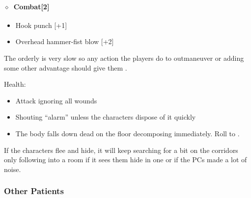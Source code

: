 \paragraph{\(\diamond\)~Combat[2]}%
\begin{itemize}[noitemsep]
  \item Hook punch [+1]
  \item Overhead hammer-fist blow [+2]
\end{itemize}
The orderly is very slow so any action the players do to outmaneuver or adding some other advantage should give them .


Health:   

\begin{itemize}[noitemsep]
  \item Attack ignoring all wounds
  \item Shouting “alarm” unless the characters dispose of it quickly
  \item[\KULTgold{\skull}] The body falls down dead on the floor decomposing immediately.  Roll to .
\end{itemize}

If the characters flee and hide, it will keep searching for a bit on the corridors only following into a room if it sees them
hide in one or if the PCs made a lot of noise.

\subsubsection{Other Patients}%
\label{ssub:other_patients}

